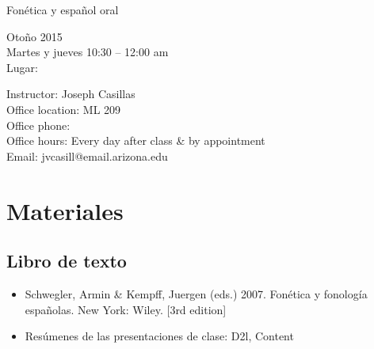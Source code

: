\documentclass[12pt]{article}
\begin{document}
\begin{center} \begin{bf} \Large{Fonética y español oral}\end{bf} \end{center}

\begin{singlespace}
\noindent Otoño 2015\\
\noindent Martes y jueves 10:30 -- 12:00 am \\
\noindent Lugar: 
\end{singlespace}

\begin{singlespace}
\noindent Instructor: Joseph Casillas\\
\noindent Office location: ML 209\\
\noindent Office phone: \\
\noindent Office hours: Every day after class \& by appointment\\
\noindent Email: jvcasill@email.arizona.edu\\
\end{singlespace}



\section{Materiales}
\subsection{Libro de texto}

\begin{singlespace}
	\begin{itemize}
	\itemsep=-2pt
		\item Schwegler, Armin \& Kempff, Juergen (eds.) 2007. Fonética y fonología españolas.  New York: Wiley. [3rd edition]
		\item Resúmenes de las presentaciones de clase:  D2l, Content
	\end{itemize}
\end{singlespace}
\end{document}
